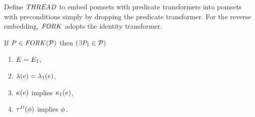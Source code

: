 Define $\sTHREAD{}$ to embed pomsets with predicate transformers into pomsets with preconditions
simply by dropping the predicate transformer.
For the reverse embedding, $\sFORK{}$ adopts the identity transformer.
\begin{definition}
  If $\aPS\SB0 \in \sFORK{\aPSS}$ then
  $(\exists\aPS_1\in\aPSS)$
  \begin{enumerate}
  \item $\aEvs\SB0=\aEvs_1$,
  \item $\labelingAct\SB0(\aEv) = \labelingAct_1(\aEv)$,
  \item $\labelingForm\SB0(\aEv)$ implies $\labelingForm_1(\aEv)$, 
  \item $\aTr[\bEvs]\SB0(\aForm)$ implies $\aForm$.
  \end{enumerate}  
\end{definition}

